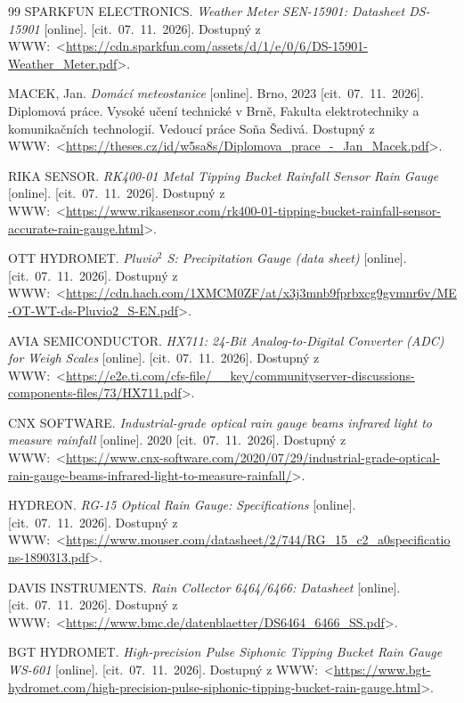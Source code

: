\documentclass[oneside]{ctuthesis}
\theoremstyle{plain}
\theoremstyle{definition}
\theoremstyle{note}
\begin{document}
\begin{thebibliography}{99}
 SPARKFUN ELECTRONICS. \textit{Weather Meter SEN-15901: Datasheet DS-15901} [online]. [cit.~07.~11.~2026]. Dostupný z WWW:~<\url{https://cdn.sparkfun.com/assets/d/1/e/0/6/DS-15901-Weather_Meter.pdf}>.

 MACEK, Jan. \textit{Domácí meteostanice} [online]. Brno, 2023 [cit.~07.~11.~2026]. Diplomová práce. Vysoké učení technické v Brně, Fakulta elektrotechniky a komunikačních technologií. Vedoucí práce Soňa Šedivá. Dostupný z WWW:~<\url{https://theses.cz/id/w5sa8s/Diplomova_prace_-_Jan_Macek.pdf}>.

 RIKA SENSOR. \textit{RK400-01 Metal Tipping Bucket Rainfall Sensor Rain Gauge} [online]. [cit.~07.~11.~2026]. Dostupný z WWW:~<\url{https://www.rikasensor.com/rk400-01-tipping-bucket-rainfall-sensor-accurate-rain-gauge.html}>.

 OTT HYDROMET. \textit{Pluvio$^2$ S: Precipitation Gauge (data sheet)} [online]. [cit.~07.~11.~2026]. Dostupný z WWW:~<\url{https://cdn.hach.com/1XMCM0ZF/at/x3j3mnb9fprbxcg9gvmnr6v/ME-OT-WT-ds-Pluvio2_S-EN.pdf}>.

 AVIA SEMICONDUCTOR. \textit{HX711: 24-Bit Analog-to-Digital Converter (ADC) for Weigh Scales} [online]. [cit.~07.~11.~2026]. Dostupný z WWW:~<\url{https://e2e.ti.com/cfs-file/__key/communityserver-discussions-components-files/73/HX711.pdf}>.

 CNX SOFTWARE. \textit{Industrial-grade optical rain gauge beams infrared light to measure rainfall} [online]. 2020 [cit.~07.~11.~2026]. Dostupný z WWW:~<\url{https://www.cnx-software.com/2020/07/29/industrial-grade-optical-rain-gauge-beams-infrared-light-to-measure-rainfall/}>.

 HYDREON. \textit{RG-15 Optical Rain Gauge: Specifications} [online]. [cit.~07.~11.~2026]. Dostupný z WWW:~<\url{https://www.mouser.com/datasheet/2/744/RG_15_c2_a0specifications-1890313.pdf}>.

 DAVIS INSTRUMENTS. \textit{Rain Collector 6464/6466: Datasheet} [online]. [cit.~07.~11.~2026]. Dostupný z WWW:~<\url{https://www.bmc.de/datenblaetter/DS6464_6466_SS.pdf}>.

 BGT HYDROMET. \textit{High-precision Pulse Siphonic Tipping Bucket Rain Gauge WS-601} [online]. [cit.~07.~11.~2026]. Dostupný z WWW:~<\url{https://www.bgt-hydromet.com/high-precision-pulse-siphonic-tipping-bucket-rain-gauge.html}>.


\end{thebibliography}
\end{document}
